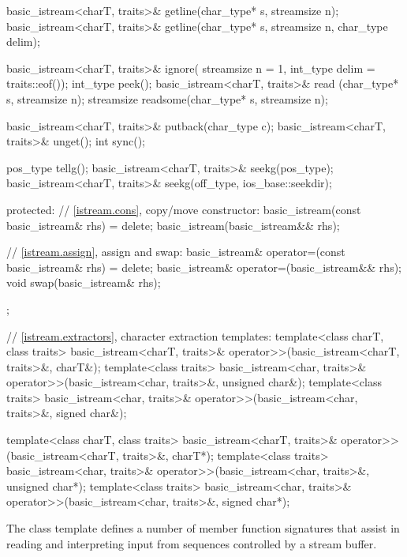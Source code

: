 \begin{codeblock}
{{    basic_istream<charT, traits>& getline(char_type* s, streamsize n);
    basic_istream<charT, traits>& getline(char_type* s, streamsize n,
                                          char_type delim);

    basic_istream<charT, traits>& ignore(
      streamsize n = 1, int_type delim = traits::eof());
    int_type                      peek();
    basic_istream<charT, traits>& read    (char_type* s, streamsize n);
    streamsize                    readsome(char_type* s, streamsize n);

    basic_istream<charT, traits>& putback(char_type c);
    basic_istream<charT, traits>& unget();
    int sync();

    pos_type tellg();
    basic_istream<charT, traits>& seekg(pos_type);
    basic_istream<charT, traits>& seekg(off_type, ios_base::seekdir);

  protected:
    // \ref{istream.cons}, copy/move constructor:
    basic_istream(const basic_istream& rhs) = delete;
    basic_istream(basic_istream&& rhs);

    // \ref{istream.assign}, assign and swap:
    basic_istream& operator=(const basic_istream& rhs) = delete;
    basic_istream& operator=(basic_istream&& rhs);
    void swap(basic_istream& rhs);
  };

  // \ref{istream.extractors}, character extraction templates:
  template<class charT, class traits>
    basic_istream<charT, traits>& operator>>(basic_istream<charT, traits>&,
                                             charT&);
  template<class traits>
    basic_istream<char, traits>& operator>>(basic_istream<char, traits>&,
                                            unsigned char&);
  template<class traits>
    basic_istream<char, traits>& operator>>(basic_istream<char, traits>&,
                                            signed char&);

  template<class charT, class traits>
    basic_istream<charT, traits>& operator>>(basic_istream<charT, traits>&,
                                             charT*);
  template<class traits>
    basic_istream<char, traits>& operator>>(basic_istream<char, traits>&,
                                            unsigned char*);
  template<class traits>
    basic_istream<char, traits>& operator>>(basic_istream<char, traits>&,
                                            signed char*);
}
\end{codeblock}

\pnum
The class template
defines a number of member function
signatures that assist in reading and interpreting input from sequences
controlled by a stream buffer.

